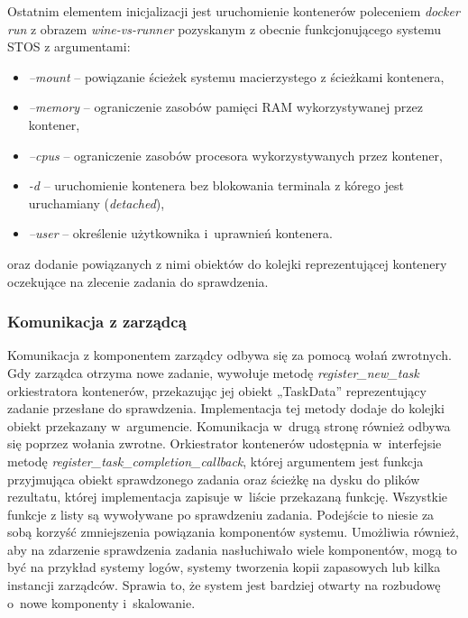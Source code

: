 Ostatnim elementem inicjalizacji jest uruchomienie kontenerów poleceniem \textit{docker run} z obrazem \textit{wine-vs-runner} pozyskanym z obecnie funkcjonującego systemu STOS z argumentami:
\begin{itemize}
    \item \textit{--mount} -- powiązanie ścieżek systemu macierzystego z ścieżkami kontenera,
    \item \textit{--memory} -- ograniczenie zasobów pamięci RAM wykorzystywanej przez kontener,
    \item \textit{--cpus} -- ograniczenie zasobów procesora wykorzystywanych przez kontener,
    \item \textit{-d} -- uruchomienie kontenera bez blokowania terminala z kórego jest uruchamiany (\textit{detached}),
    \item \textit{--user} -- określenie użytkownika i~uprawnień kontenera.
\end{itemize}
oraz dodanie powiązanych z nimi obiektów do kolejki reprezentującej kontenery oczekujące na zlecenie zadania do sprawdzenia.

\subsubsection{Komunikacja z zarządcą}
Komunikacja z komponentem zarządcy odbywa się za pomocą wołań zwrotnych. Gdy zarządca otrzyma nowe zadanie, wywołuje metodę \textit{register\_new\_task} orkiestratora kontenerów, przekazując jej obiekt „TaskData” reprezentujący zadanie przesłane do sprawdzenia. Implementacja tej metody dodaje do kolejki obiekt przekazany w~argumencie. Komunikacja w~drugą stronę również odbywa się poprzez wołania zwrotne. Orkiestrator kontenerów udostępnia w~interfejsie metodę \textit{register\_task\_completion\_callback}, której argumentem jest funkcja przyjmująca obiekt sprawdzonego zadania oraz ścieżkę na dysku do plików rezultatu, której implementacja zapisuje w~liście przekazaną funkcję. Wszystkie funkcje z listy są wywoływane po sprawdzeniu zadania. Podejście to niesie za sobą korzyść zmniejszenia powiązania komponentów systemu. Umożliwia również, aby na zdarzenie sprawdzenia zadania nasłuchiwało wiele komponentów, mogą to być na przykład systemy logów, systemy tworzenia kopii zapasowych lub kilka instancji zarządców. Sprawia to, że system jest bardziej otwarty na rozbudowę o~nowe komponenty i~skalowanie.

